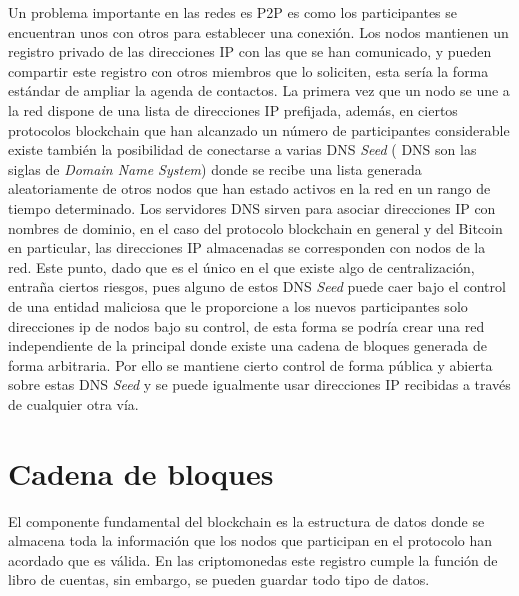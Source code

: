 Un problema importante en las redes es P2P es como los participantes se encuentran unos con otros para establecer una conexión. Los nodos mantienen un registro privado de las direcciones IP con las que se han comunicado, y pueden compartir este registro con otros miembros que lo soliciten, esta sería la forma estándar de ampliar la agenda de contactos. La primera vez que un nodo se une a la red dispone de una lista de direcciones IP prefijada, además, en ciertos protocolos blockchain que han alcanzado un número de participantes considerable existe también la posibilidad de conectarse a varias DNS \textit{Seed} ( DNS son las siglas de \textit{Domain Name System}) donde se recibe una lista generada aleatoriamente de otros nodos que han estado activos en la red en un rango de tiempo determinado. Los servidores DNS sirven para asociar direcciones IP con nombres de dominio, en el caso del protocolo blockchain en general y del Bitcoin en particular, las direcciones IP almacenadas se corresponden con nodos de la red. Este punto, dado que es el único en el que existe algo de centralización, entraña ciertos riesgos, pues alguno de estos DNS \textit{Seed} puede caer bajo el control de una entidad maliciosa que le proporcione a los nuevos participantes solo direcciones ip de nodos bajo su control, de esta forma se podría crear una red independiente de la principal donde existe una cadena de bloques generada de forma arbitraria. Por ello se mantiene cierto control de forma pública y abierta sobre estas DNS \textit{Seed} y se puede igualmente usar direcciones IP  recibidas a través de cualquier otra vía.


\section{Cadena de bloques}\label{bloques}
El componente fundamental del blockchain es la estructura de datos donde se almacena toda la información que los nodos que participan en el protocolo han acordado que es válida. En las criptomonedas este registro cumple la función de libro de cuentas, sin embargo, se pueden guardar todo tipo de datos.

